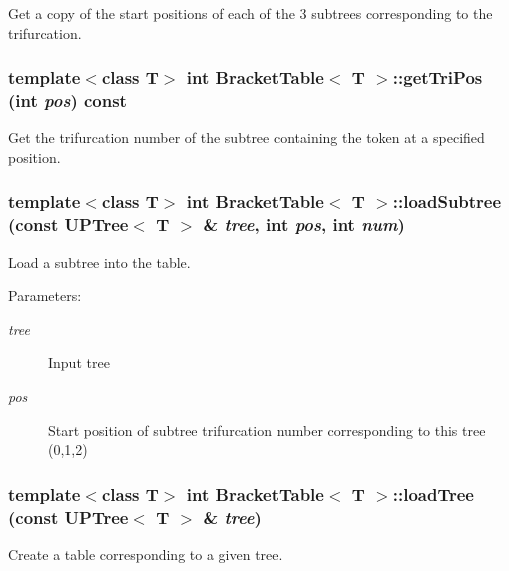 Get a copy of the start positions of each of the 3 subtrees corresponding to the trifurcation. 

\subsubsection{\setlength{\rightskip}{0pt plus 5cm}template$<$class T$>$ int {\bf Bracket\-Table}$<$ T $>$::get\-Tri\-Pos (int {\em pos}) const\hspace{0.3cm}{\tt  [inline]}}\label{classBracketTable_a11}


Get the trifurcation number of the subtree containing the token at a specified position. 

\subsubsection{\setlength{\rightskip}{0pt plus 5cm}template$<$class T$>$ int {\bf Bracket\-Table}$<$ T $>$::load\-Subtree (const {\bf UPTree}$<$ T $>$ \& {\em tree}, int {\em pos}, int {\em num})}\label{classBracketTable_a6}


Load a subtree into the table. 

\begin{Desc}
\item[Parameters:]
\begin{description}
\item[{\em tree}]Input tree \item[{\em pos}]Start position of subtree  trifurcation number corresponding to this tree (0,1,2) \end{description}
\end{Desc}
\subsubsection{\setlength{\rightskip}{0pt plus 5cm}template$<$class T$>$ int {\bf Bracket\-Table}$<$ T $>$::load\-Tree (const {\bf UPTree}$<$ T $>$ \& {\em tree})}\label{classBracketTable_a5}


Create a table corresponding to a given tree. 

